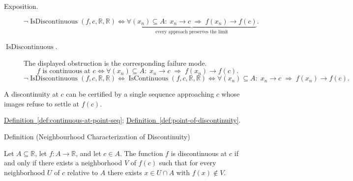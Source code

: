 \begin{remark*}
\begin{description}
  \item[Exposition.]
\[
\neg \operatorname{IsDiscontinuous}(f,c,\mathbb{R},\mathbb{R})
\Longleftrightarrow
\underbrace{\forall (x_n)\subseteq A:\;
  x_n\to c \;\Rightarrow\; f(x_n)\to f(c)
}_{\text{every approach preserves the limit}}.
\]


  \item[\(\operatorname{IsDiscontinuous}.\)]
  The displayed obstruction is the corresponding failure mode.
  \[
f \text{ is continuous at } c \Longleftrightarrow
\forall (x_n)\subseteq A:\; x_n\to c \;\Rightarrow\; f(x_n)\to f(c).
  \]
  \[
\neg \operatorname{IsDiscontinuous}(f,c,\mathbb{R},\mathbb{R})
\Longleftrightarrow
\operatorname{IsContinuous}(f,c,\mathbb{R},\mathbb{R})
\Longleftrightarrow
\forall (x_n)\subseteq A:\; x_n\to c \;\Rightarrow\; f(x_n)\to f(c).
  \]
\end{description}
\end{remark*}

\begin{remark*}[Interpretation]
A discontinuity at $c$ can be certified by a single sequence approaching $c$ whose images refuse to settle at $f(c)$.
\end{remark*}

\begin{dependencies}
\hyperref[def:continuous-at-point-seq]{Definition~\ref{def:continuous-at-point-seq}}; \hyperref[def:point-of-discontinuity]{Definition~\ref{def:point-of-discontinuity}}.
\end{dependencies}


\begin{definitionbox}{Definition (Neighbourhood Characterization of Discontinuity)}
\begin{definition}
\label{def:neighborhood-discontinuity-at-a-point}
Let $A \subseteq \mathbb{R}$, let $f \colon A \to \mathbb{R}$, and let $c \in A$. The function $f$ is discontinuous at $c$ if and only if there exists a neighborhood $V$ of $f(c)$ such that for every neighborhood $U$ of $c$ relative to $A$ there exists $x \in U \cap A$ with $f(x) \notin V$.
\end{definition}
\end{definitionbox}

